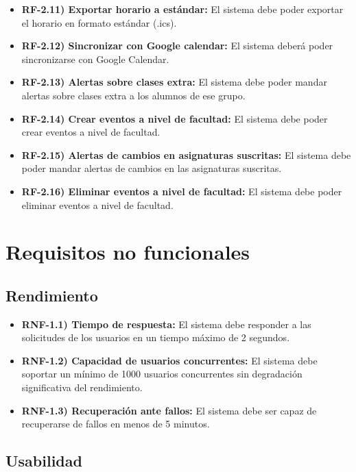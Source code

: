 \begin{itemize}
\begin{itemize}
        \item \textbf{RF-2.11) Exportar horario a estándar:} El sistema debe poder exportar el horario en formato estándar (.ics).
        \item \textbf{RF-2.12) Sincronizar con Google calendar:} El sistema deberá poder sincronizarse con Google Calendar.
        \item \textbf{RF-2.13) Alertas sobre clases extra:} El sistema debe poder mandar alertas sobre clases extra a los alumnos de ese grupo.
        \item \textbf{RF-2.14) Crear eventos a nivel de facultad:} El sistema debe poder crear eventos a nivel de facultad.
        \item \textbf{RF-2.15) Alertas de cambios en asignaturas suscritas:} El sistema debe poder mandar alertas de cambios en las asignaturas suscritas.
        \item \textbf{RF-2.16) Eliminar eventos a nivel de facultad:} El sistema debe poder eliminar eventos a nivel de facultad.
    \end{itemize}
\end{itemize}

\section{Requisitos no funcionales}

\subsection{Rendimiento}

\begin{itemize}
    \item \textbf{RNF-1.1) Tiempo de respuesta:} El sistema debe responder a las solicitudes de los usuarios en un tiempo máximo de 2 segundos.
    \item \textbf{RNF-1.2) Capacidad de usuarios concurrentes:} El sistema debe soportar un mínimo de 1000 usuarios concurrentes sin degradación significativa del rendimiento.    \item \textbf{RNF-1.3) Recuperación ante fallos:} El sistema debe ser capaz de recuperarse de fallos en menos de 5 minutos.
\end{itemize}

\subsection{Usabilidad}

